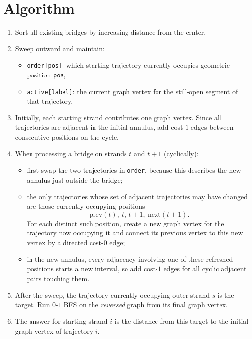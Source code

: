 \documentclass[11pt]{article}
\begin{document}
\section*{Algorithm}

\begin{enumerate}[leftmargin=*]
    \item Sort all existing bridges by increasing distance from the center.

    \item Sweep outward and maintain:
    \begin{itemize}[leftmargin=*]
        \item \texttt{order[pos]}: which starting trajectory currently occupies geometric position
        \texttt{pos},
        \item \texttt{active[label]}: the current graph vertex for the still-open segment of that trajectory.
    \end{itemize}

    \item Initially, each starting strand contributes one graph vertex. Since all trajectories are adjacent in
    the initial annulus, add cost-$1$ edges between consecutive positions on the cycle.

    \item When processing a bridge on strands $t$ and $t+1$ (cyclically):
    \begin{itemize}[leftmargin=*]
        \item first swap the two trajectories in \texttt{order}, because this describes the new annulus just
        outside the bridge;
        \item the only trajectories whose set of adjacent trajectories may have changed are those currently
        occupying positions
        \[
            \text{prev}(t),\ t,\ t+1,\ \text{next}(t+1).
        \]
        For each distinct such position, create a new graph vertex for the trajectory now occupying it and
        connect its previous vertex to this new vertex by a directed cost-$0$ edge;
        \item in the new annulus, every adjacency involving one of these refreshed positions starts a new
        interval, so add cost-$1$ edges for all cyclic adjacent pairs touching them.
    \end{itemize}

    \item After the sweep, the trajectory currently occupying outer strand $s$ is the target. Run $0$-$1$
    BFS on the \emph{reversed} graph from its final graph vertex.

    \item The answer for starting strand $i$ is the distance from this target to the initial graph vertex of
    trajectory $i$.
\end{enumerate}
\end{document}
